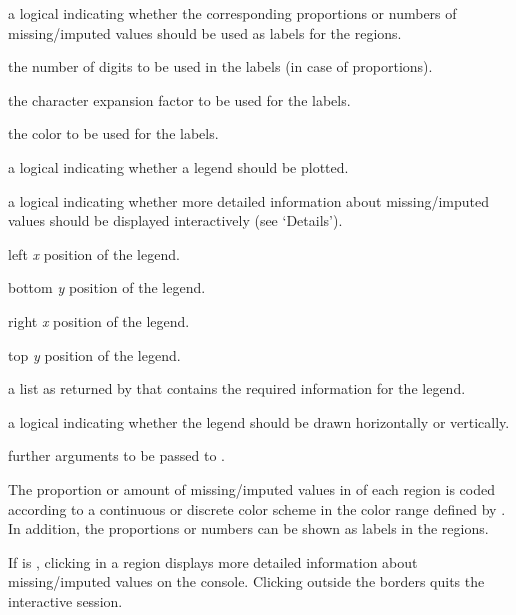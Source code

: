 \begin{Arguments}
\begin{ldescription}
\item[\code{numbers}] a logical indicating whether the corresponding proportions or 
numbers of missing/imputed values should be used as labels for the regions.
\item[\code{digits}] the number of digits to be used in the labels (in case of 
proportions).
\item[\code{cex.numbers}] the character expansion factor to be used for the labels.
\item[\code{col.numbers}] the color to be used for the labels.
\item[\code{legend}] a logical indicating whether a legend should be plotted.
\item[\code{interactive}] a logical indicating whether more detailed information 
about missing/imputed values should be displayed interactively (see 
`Details').
\item[\code{xleft}] left \emph{x} position of the legend.
\item[\code{ybottom}] bottom \emph{y} position of the legend.
\item[\code{xright}] right \emph{x} position of the legend.
\item[\code{ytop}] top \emph{y} position of the legend.
\item[\code{cmap}] a list as returned by  that contains the 
required information for the legend.
\item[\code{horizontal}] a logical indicating whether the legend should be drawn 
horizontally or vertically.
\item[\code{...}] further arguments to be passed to .
\end{ldescription}
\end{Arguments}
%
\begin{Details}\relax
The proportion or amount of missing/imputed values in  of each region is 
coded according to a continuous or discrete color scheme in the color range 
defined by .  In addition, the proportions or numbers can be shown 
as labels in the regions.

If  is , clicking in a region displays more 
detailed information about missing/imputed values on the \R{} console.  Clicking 
outside the borders quits the interactive session.
\end{Details}
%
